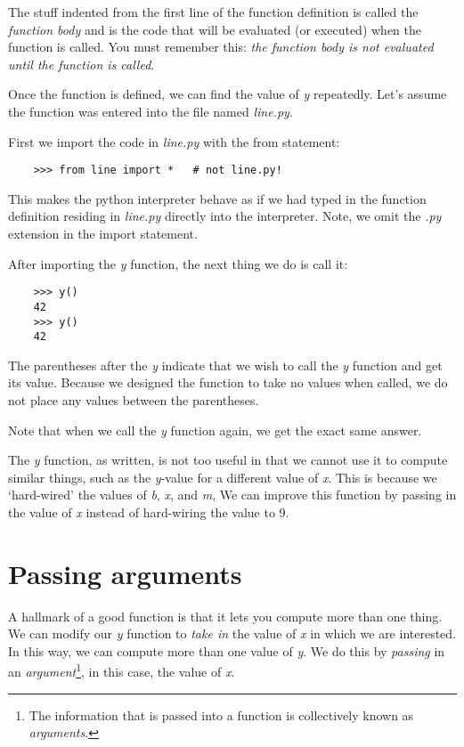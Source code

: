 The stuff indented from the first line of the function definition
is called the {\it function body} and
is the code that will be evaluated (or executed) when the
function is called. You must remember this: {\it the function body
is not evaluated until the function is called}.

Once the function is defined, we can find the value of {\it y} repeatedly.
Let's assume the function was entered into the file named
{\it line.py}.

First we import the code in {\it line.py} with the from statement:

\begin{verbatim}
    >>> from line import *   # not line.py!
\end{verbatim}

This makes the python interpreter behave as if we had typed
in the function definition residing in {\it line.py} directly into
the interpreter. Note, we omit the {\it .py} extension in the import
statement.

After importing the {\it y} function, the next thing we do
is call it:

\begin{verbatim}
    >>> y()
    42
    >>> y()
    42
\end{verbatim}
    
The parentheses after the {\it y} indicate that we wish to call
the {\it y} function and get its value. Because we designed the
function to take no values when called, we do not place any
values between the parentheses.

Note that when we call the {\it y} function again,
we get the exact same answer.

The {\it y} function, as written,
is not too useful in that we cannot use it to compute
similar things, such as the {\it y}-value for a different value of
{\it x}.
This is because we `hard-wired' the values of {\it b}, {\it x}, and {\it m},
We can improve this function by passing in the value of {\it x}
instead of hard-wiring the value to 9.

\section{Passing arguments}

A hallmark of a good function is that it lets you compute
more than one thing. We can modify our {\it y} function to {\it take in} the
value of {\it x} in which we are interested.
In this way,
we can compute more than one value of {\it y}.
We do this by {\it passing} in 
an {\it argument}\footnote{
The information that is passed into a function is collectively
known as {\it arguments}.}, in this case, the value of {\it x}.

